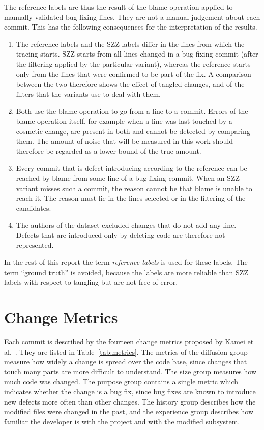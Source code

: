 \documentclass[12pt,a4paper,oneside]{report}
\begin{document}
The reference labels are thus the result of the blame operation applied to
manually validated bug-fixing lines. They are not a manual judgement about
each commit. This has the following consequences for the interpretation of
the results.

\begin{enumerate}[leftmargin=*]
\item The reference labels and the SZZ labels differ in the lines from which
the tracing starts. SZZ starts from all lines changed in a bug-fixing commit
(after the filtering applied by the particular variant), whereas the reference
starts only from the lines that were confirmed to be part of the fix. A
comparison between the two therefore shows the effect of tangled changes, and
of the filters that the variants use to deal with them.
\item Both use the blame operation to go from a line to a commit. Errors of
the blame operation itself, for example when a line was last touched by a
cosmetic change, are present in both and cannot be detected by comparing
them. The amount of noise that will be measured in this work should therefore
be regarded as a lower bound of the true amount.
\item Every commit that is defect-introducing according to the reference can
be reached by blame from some line of a bug-fixing commit. When an SZZ
variant misses such a commit, the reason cannot be that blame is unable to
reach it. The reason must lie in the lines selected or in the filtering of the
candidates.
\item The authors of the dataset excluded changes that do not add any line.
Defects that are introduced only by deleting code are therefore not
represented.
\end{enumerate}

In the rest of this report the term \emph{reference labels} is used for these
labels. The term ``ground truth'' is avoided, because the labels are more
reliable than SZZ labels with respect to tangling but are not free of error.

\section{Change Metrics}\label{sec:features}

Each commit is described by the fourteen change metrics proposed by Kamei et
al.~\cite{kamei2013jit}. They are listed in Table~\ref{tab:metrics}. The
metrics of the diffusion group measure how widely a change is spread over the
code base, since changes that touch many parts are more difficult to
understand. The size group measures how much code was changed. The purpose
group contains a single metric which indicates whether the change is a bug
fix, since bug fixes are known to introduce new defects more often than other
changes. The history group describes how the modified files were changed in
the past, and the experience group describes how familiar the developer is
with the project and with the modified subsystem.
\end{document}
